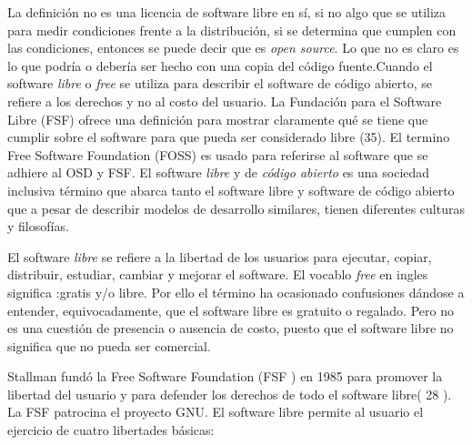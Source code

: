 \documentclass[a4paper,11pt]{article}
\begin{document}
 La definición no es una licencia de software libre en sí, si no algo que se utiliza para medir condiciones frente a la distribución, si se determina que cumplen con las condiciones, entonces se puede decir que es \textit{open source}. Lo que no es claro es lo que podría o debería ser hecho con una copia del código fuente.Cuando el software \textit{libre} o \textit{free} se utiliza para describir el software de código abierto, se refiere a los derechos y no al costo del usuario. La Fundación para el Software Libre (FSF) ofrece una definición para mostrar claramente qué se tiene que cumplir sobre el software para que pueda ser considerado libre (35). El termino Free Software Foundation (FOSS) es usado para referirse al software que se adhiere al OSD y FSF. El software \textit{libre} y de \textit{código abierto} es una sociedad inclusiva término que abarca tanto el software libre y software de código abierto que a pesar de describir modelos de desarrollo similares, tienen diferentes culturas y filosofías.

El software \textit{libre} se refiere a la libertad de los usuarios para ejecutar, copiar, distribuir, estudiar, cambiar y mejorar el software. El vocablo \textit{free} en ingles significa :gratis y/o libre. Por ello el término ha ocasionado confusiones dándose a entender, equivocadamente, que el software libre es gratuito o regalado. Pero no es una cuestión de presencia o ausencia de costo, puesto que el software libre no significa que no pueda ser comercial.

Stallman fundó la Free Software Foundation (FSF ) en 1985 para promover la libertad del usuario y para defender los derechos de todo el software libre( 28 ). La FSF patrocina el proyecto GNU. El software libre permite al usuario el ejercicio de cuatro libertades básicas:
\end{document}
